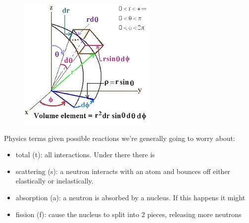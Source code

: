 \documentclass[12pt]{article}
\begin{document}
\begin{figure}[h!]
\begin{center}
\includegraphics[height=2 in]{VolumeElement}
\end{center}
\end{figure}

Physics terms given possible reactions we're generally going to worry about:
\begin{itemize}
\item total (t): all interactions. Under there there is 
\item scattering (s): a neutron interacts with an atom and bounces off either elastically or inelastically.
\item absorption (a): a neutron is absorbed by a nucleus. If this happens it might
\item fission (f): cause the nucleus to split into 2 pieces, releasing more neutrons
\end{itemize}
\end{document}
